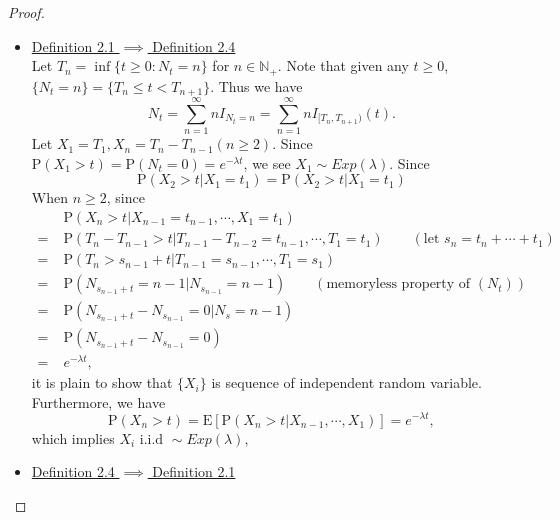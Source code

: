 \documentclass{article}
\theoremstyle{nonumberplain}
\newtheorem{proof}{Proof.}
\begin{document}
\begin{proof}
\begin{itemize}
	\item\noindent\underline{Definition 2.1 $\implies$ Definition 2.4}\\
	Let $T_n=\inf\{t\ge0:N_t= n\}$ for $n\in\mathbb{N}_+$. Note that given any $t\ge0$, $\{N_t=n\}=\{T_n\le t<T_{n+1}\}$. Thus we have
	\[
	N_t=\sum_{n=1}^{\infty}nI_{N_t=n}=\sum_{n=1}^{\infty}nI_{[T_n,T_{n+1})}(t).
	\]
	Let $X_1=T_1,X_{n}=T_{n}-T_{n-1}(n\ge2)$. Since $\mathrm{P}(X_1>t)=\mathrm{P}(N_t=0)=e^{-\lambda t}$, we see $X_1\sim Exp(\lambda)$. 
	Since
	\[
	\mathrm{P}(X_2>t|X_1=t_1)=\mathrm{P}(X_2>t|X_1=t_1)
	\]
	When $n\ge2$, since
	\begin{align*}
	&\mathrm{P}(X_n>t|X_{n-1}=t_{n-1},\cdots,X_1=t_1)\\
	=\;&\mathrm{P}(T_{n}-T_{n-1}>t|T_{n-1}-T_{n-2}=t_{n-1},\cdots,T_1=t_1)\qquad(\text{let }s_n=t_{n}+\cdots +t_1)\\
	=\;&\mathrm{P}(T_{n}>s_{n-1}+t|T_{n-1}=s_{n-1},\cdots,T_1=s_1)\\
	=\;&\mathrm{P}(N_{s_{n-1}+t}=n-1|N_{s_{n-1}}=n-1)\qquad(\text{memoryless property of }(N_t))\\
	=\;&\mathrm{P}(N_{s_{n-1}+t}-N_{s_{n-1}}=0|N_s=n-1)\\
	=\;&\mathrm{P}(N_{s_{n-1}+t}-N_{s_{n-1}}=0)\\
	=\;&e^{-\lambda t},
	\end{align*}
	it is plain to show that $\{X_i\}$ is sequence of independent random variable. Furthermore, we have $$\mathrm{P}(X_n>t)=\mathrm{E}[\mathrm{P}(X_n>t|X_{n-1},\cdots,X_1)]=e^{-\lambda t},$$
	which implies $X_i\text{ i.i.d }\sim Exp(\lambda)$,
	\item\noindent\underline{Definition 2.4 $\implies$ Definition 2.1}
	

\end{itemize}
\end{proof}
\end{document}
